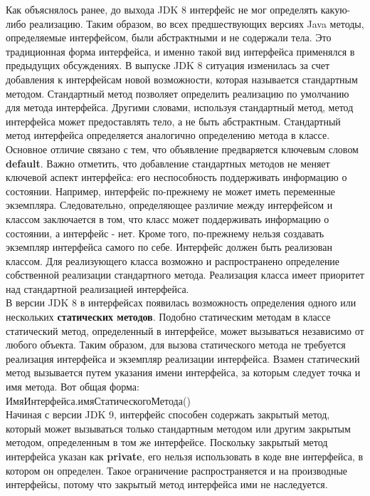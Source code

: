 Как объяснялось ранее, до выхода JDK 8 интерфейс не мог определять какую-либо реализацию. Таким образом, во всех предшествующих версиях Java методы, определяемые интерфейсом, были абстрактными и не содержали тела. Это традиционная форма интерфейса, и именно такой вид интерфейса применялся в предыдущих обсуждениях. В выпуске JDK 8 ситуация изменилась за счет добавления к интерфейсам новой возможности, которая называется стандартным методом. Стандартный метод позволяет определить реализацию по умолчанию для метода интерфейса. Другими словами, используя стандартный метод, метод интерфейса может предоставлять тело, а не быть абстрактным. Стандартный метод интерфейса определяется аналогично определению метода в классе. Основное отличие связано с тем, что объявление предваряется ключевым словом \textbf{default}. Важно отметить, что добавление стандартных методов не меняет ключевой аспект интерфейса: его неспособность поддерживать информацию о состоянии. Например, интерфейс по-прежнему не может иметь переменные экземпляра. Следовательно, определяющее различие между интерфейсом и классом заключается в том, что класс может поддерживать информацию о состоянии, а интерфейс - нет. Кроме того, по-прежнему нельзя создавать экземпляр интерфейса самого по себе. Интерфейс должен быть реализован классом. Для реализующего класса возможно и распространено определение собственной реализации стандартного метода. Реализация класса имеет приоритет над стандартной реализацией интерфейса. \\
В версии JDK 8 в интерфейсах появилась возможность определения одного или нескольких \textbf{статических методов}. Подобно статическим методам в классе статический метод, определенный в интерфейсе, может вызываться
независимо от любого объекта. Таким образом, для вызова статического метода не требуется реализация интерфейса и экземпляр реализации интерфейса. Взамен статический метод вызывается путем указания имени интерфейса,
за которым следует точка и имя метода. Вот общая форма: \\
ИмяИнтерфейса.имяСтатическогоМетода() \\
Начиная с версии JDK 9, интерфейс способен содержать закрытый метод, который может вызываться только стандартным методом или другим закрытым методом, определенным в том же интерфейсе. Поскольку закрытый метод интерфейса указан как \textbf{private}, его нельзя использовать в коде вне интерфейса, в котором он определен. Такое ограничение распространяется и на производные интерфейсы, потому что закрытый метод интерфейса ими не
наследуется. 

